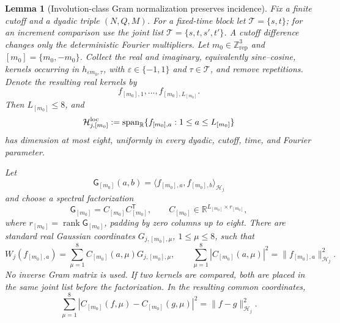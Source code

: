 \documentclass[10pt]{amsart}
\numberwithin{equation}{section}
\theoremstyle{plain}
\newtheorem{lemma}[theorem]{Lemma}
\theoremstyle{definition}
\theoremstyle{remark}
\begin{document}
\begin{lemma}[Involution-class Gram normalization preserves incidence]\label{lem:labelwise-auxiliary-coordinates}
Fix a finite cutoff and a dyadic triple $(N,Q,M)$.  For a fixed-time block let
$\mathcal T=\{s,t\}$; for an increment comparison use the joint list
$\mathcal T=\{s,t,s',t'\}$.  A cutoff difference changes only the deterministic
Fourier multipliers.  Let $m_0\in\mathbb Z^3_{\mathrm{rep}}$ and
$[m_0]=\{m_0,-m_0\}$.  Collect the real and imaginary, equivalently
sine--cosine, kernels occurring in
$h_{\varepsilon m_0,\tau}$, with $\varepsilon\in\{-1,1\}$ and
$\tau\in\mathcal T$, and remove repetitions.  Denote the resulting real
kernels by
\[
        f_{[m_0],1},\ldots,f_{[m_0],L_{[m_0]}}.
\]
Then $L_{[m_0]}\le8$, and
\[
        \mathcal H_{j,[m_0]}^{\rm loc}
        :=\operatorname{span}_{\mathbb R}
          \{f_{[m_0],a}:1\le a\le L_{[m_0]}\}
\]
has dimension at most eight, uniformly in every dyadic, cutoff, time, and
Fourier parameter.

Let
\begin{equation}\label{eq:local-time-gram}
        \mathsf G_{[m_0]}(a,b)
        =\langle f_{[m_0],a},f_{[m_0],b}\rangle_{\mathcal H_j}
\end{equation}
and choose a spectral factorization
\begin{equation}\label{eq:local-time-gram-factor}
        \mathsf G_{[m_0]}
        =C_{[m_0]}C_{[m_0]}^{\mathsf T},
        \qquad
        C_{[m_0]}\in
        \mathbb R^{L_{[m_0]}\times r_{[m_0]}},
\end{equation}
where $r_{[m_0]}=\operatorname{rank}\mathsf G_{[m_0]}$, padding by zero
columns up to eight.  There are standard real Gaussian coordinates
$G_{j,[m_0],\mu}$, $1\le\mu\le8$, such that
\begin{equation}\label{eq:local-kernel-coordinate-expansion}
        W_j(f_{[m_0],a})
        =\sum_{\mu=1}^{8}C_{[m_0]}(a,\mu)G_{j,[m_0],\mu},
        \qquad
        \sum_{\mu=1}^{8}|C_{[m_0]}(a,\mu)|^2
        =\|f_{[m_0],a}\|_{\mathcal H_j}^2.
\end{equation}
No inverse Gram matrix is used.  If two kernels are compared, both are placed
in the same joint list before the factorization.  In the resulting common
coordinates,
\begin{equation}\label{eq:local-kernel-difference-isometry}
        \sum_{\mu=1}^{8}
        |C_{[m_0]}(f,\mu)-C_{[m_0]}(g,\mu)|^2
        =\|f-g\|_{\mathcal H_j}^2.
\end{equation}


\end{lemma}
\end{document}
